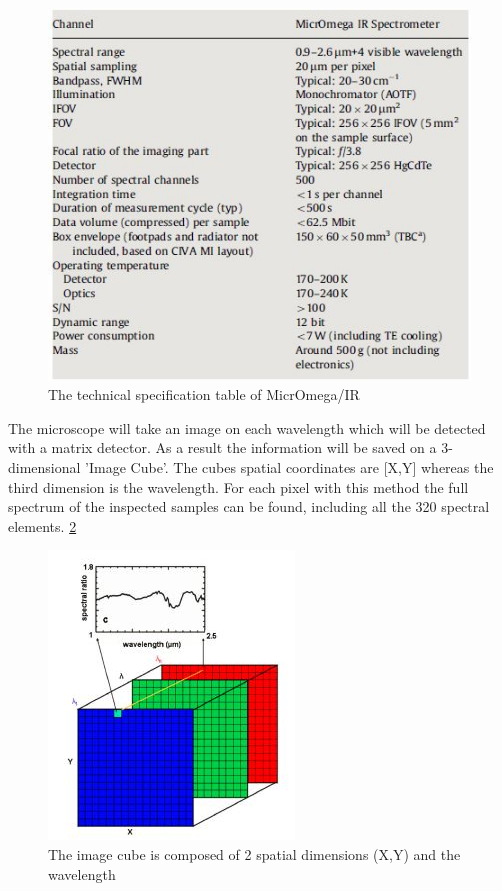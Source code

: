 \begin{figure}[htb]
  \centering
  \includegraphics[scale=0.8]{figures/BFfig/Specs_for_MicrOmega}
  \caption{The technical specification table of MicrOmega/IR}
  \label{fig:Specs_for_MicrOmega}
\end{figure}

The microscope will take an image on each wavelength which will be detected with a matrix detector. As a result the information will be saved on a 3-dimensional  'Image Cube'. The cubes spatial coordinates are [X,Y] whereas the third dimension is the wavelength. For each pixel with this method the full spectrum of the inspected samples can be found, including all the 320 spectral elements.
\ref{fig:Image_cube}

\begin{figure}[htb]
  \centering
  \includegraphics[scale=0.7]{figures/BFfig/Image_cube}
  \caption{The image cube is composed of 2 spatial dimensions (X,Y) and the wavelength}
  \label{fig:Image_cube}
\end{figure}

